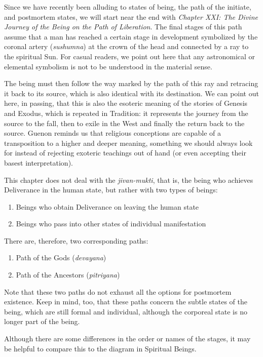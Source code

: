 Since we have recently been alluding to states of being, the path of the initiate, and postmortem states, we will start near the end with \emph{Chapter XXI: The Divine Journey of the Being on the Path of Liberation}. The final stages of this path assume that a man has reached a certain stage in development symbolized by the coronal artery (\emph{sushumna}) at the crown of the head and connected by a ray to the spiritual Sun. For casual readers, we point out here that any astronomical or elemental symbolism is not to be understood in the material sense.

The being must then follow the way marked by the path of this ray and retracing it back to its source, which is also identical with its destination. We can point out here, in passing, that this is also the esoteric meaning of the stories of Genesis and Exodus, which is repeated in Tradition: it represents the journey from the source to the fall, then to exile in the West and finally the return back to the source. Guenon reminds us that religious conceptions are capable of a transposition to a higher and deeper meaning, something we should always look for instead of rejecting exoteric teachings out of hand (or even accepting their basest interpretation).

This chapter does not deal with the \emph{jivan-mukti}, that is, the being who achieves Deliverance in the human state, but rather with two types of beings:

\begin{enumerate}
\item Beings who obtain Deliverance on leaving the human state 
\item Beings who pass into other states of individual manifestation 
\end{enumerate}
There are, therefore, two corresponding paths:

\begin{enumerate}
\item Path of the Gods (\emph{devayana}) 
\item Path of the Ancestors (\emph{pitriyana}) 
\end{enumerate}
Note that these two paths do not exhaust all the options for postmortem existence. Keep in mind, too, that these paths concern the subtle states of the being, which are still formal and individual, although the corporeal state is no longer part of the being.

Although there are some differences in the order or names of the stages, it may be helpful to compare this to the diagram in Spiritual Beings.

